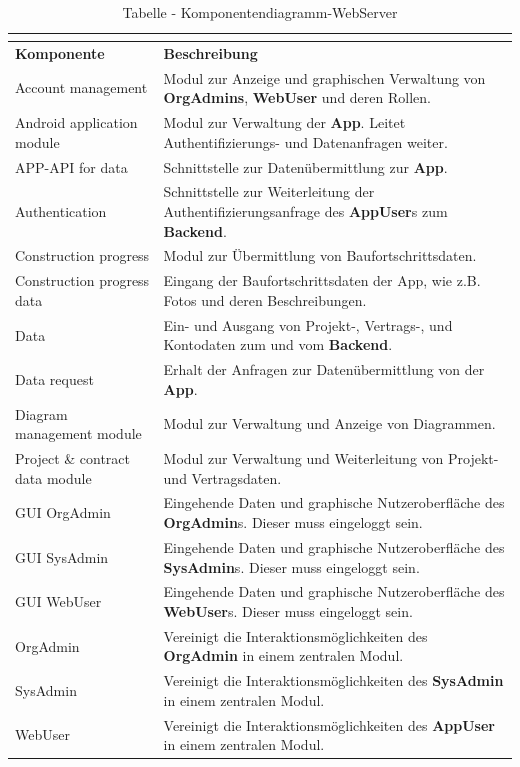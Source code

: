 \begin{longtable}[h]{|p{2.5cm}|p{10.0cm}|}
	\caption{Tabelle - Komponentendiagramm-WebServer}
	\centering
	\label{tab:table_comp_webserver}
	\endlastfoot
	\hline \multicolumn{2}{|r|}{{Weitergeführt auf der folgenden Seite}} \\ \hline
	\endfoot
	\endhead
	\hline
	\textbf{Komponente} & \textbf{Beschreibung} \\
	\hline
	Account management & Modul zur Anzeige und graphischen Verwaltung von \textbf{OrgAdmins}, \textbf{WebUser} und deren Rollen. \\
	\hline
	Android application module & Modul zur Verwaltung der \textbf{App}. Leitet Authentifizierungs- und Datenanfragen weiter. \\
	\hline
	APP-API for data & Schnittstelle zur Datenübermittlung zur \textbf{App}. \\
	\hline
	Authentication & Schnittstelle zur Weiterleitung der Authentifizierungsanfrage des \textbf{AppUser}s zum \textbf{Backend}. \\
	\hline
	Construction progress & Modul zur Übermittlung von Baufortschrittsdaten. \\
	\hline
	Construction progress data & Eingang der Baufortschrittsdaten der App, wie z.B. Fotos und deren Beschreibungen. \\
	\hline
	Data & Ein- und Ausgang von Projekt-, Vertrags-, und Kontodaten zum und vom \textbf{Backend}. \\
	\hline
	Data request & Erhalt der Anfragen zur Datenübermittlung von der \textbf{App}. \\
	\hline
	Diagram management module & Modul zur Verwaltung und Anzeige von Diagrammen. \\
	\hline
	Project {\&} contract data module & Modul zur Verwaltung und Weiterleitung von Projekt- und Vertragsdaten. \\
	\hline
	GUI OrgAdmin & Eingehende Daten und graphische Nutzeroberfläche des \textbf{OrgAdmin}s. Dieser muss eingeloggt sein. \\
	\hline
	GUI SysAdmin & Eingehende Daten und graphische Nutzeroberfläche des \textbf{SysAdmin}s. Dieser muss eingeloggt sein. \\
	\hline
	GUI WebUser & Eingehende Daten und graphische Nutzeroberfläche des \textbf{WebUser}s. Dieser muss eingeloggt sein. \\
	\hline
	OrgAdmin & Vereinigt die Interaktionsmöglichkeiten des \textbf{OrgAdmin} in einem zentralen Modul. \\
	\hline
	SysAdmin & Vereinigt die Interaktionsmöglichkeiten des \textbf{SysAdmin} in einem zentralen Modul. \\
	\hline
	WebUser & Vereinigt die Interaktionsmöglichkeiten des \textbf{AppUser} in einem zentralen Modul. \\
	\hline
\end{longtable}

